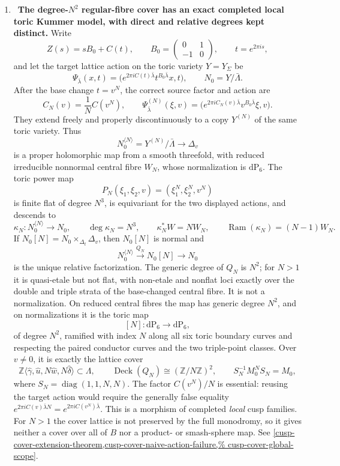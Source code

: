 \begin{enumerate}[leftmargin=1.8em,itemsep=.65em]
\item \Verified\ \textbf{The degree-\(N^2\) regular-fibre cover has an exact
completed local toric Kummer model, with direct and relative degrees kept
distinct.}
Write
\[
 Z(s)=sB_0+C(t),\qquad
 B_0=\begin{pmatrix}0&1\\-1&0\end{pmatrix},\qquad
 t=e^{2\pi i s},
\]
and let the target lattice action on the toric variety \(Y=Y_\Sigma\) be
\[
 \Psi_{\bar\lambda}(x,t)
 =\bigl(e^{2\pi iC(t)\bar\lambda}
        t^{B_0\bar\lambda}x,t\bigr),
 \qquad N_0=Y/\bar\Lambda.
\]
After the base change \(t=v^N\), the correct source factor and action are
\[
 C_N(v)=\frac1N C(v^N),\qquad
 \Psi^{(N)}_{\bar\lambda}(\xi,v)
 =\bigl(e^{2\pi iC_N(v)\bar\lambda}
        v^{B_0\bar\lambda}\xi,v\bigr).
\]
They extend freely and properly discontinuously to a copy \(Y^{(N)}\) of
the same toric variety.  Thus
\[
 N_0^{\langle N\rangle}=Y^{(N)}/\bar\Lambda
 \longrightarrow\Delta_v
\]
is a proper holomorphic map from a smooth threefold, with reduced irreducible
nonnormal central fibre \(W_N\), whose normalization is \(\mathrm{dP}_6\).  The toric
power map
\[
 P_N(\xi_1,\xi_2,v)=(\xi_1^N,\xi_2^N,v^N)
\]
is finite flat of degree \(N^3\), is equivariant for the two displayed
actions, and descends to
\[
 \kappa_N:N_0^{\langle N\rangle}\longrightarrow N_0,
 \qquad \deg\kappa_N=N^3,\qquad
 \kappa_N^*W=NW_N,\qquad
 \operatorname{Ram}(\kappa_N)=(N-1)W_N.
\]
If \(N_0[N]=N_0\times_{\Delta_t}\Delta_v\), then \(N_0[N]\) is normal and
\[
 N_0^{\langle N\rangle}\xrightarrow{Q_N}N_0[N]\longrightarrow N_0
\]
is the unique relative factorization.  The generic degree of \(Q_N\) is
\(N^2\); for \(N>1\) it is quasi-etale but not flat, with non-etale and
nonflat loci exactly over the double and triple strata of the base-changed
central fibre.  It is not a normalization.  On reduced central fibres the
map has generic degree \(N^2\), and on normalizations it is the toric map
\[
 [N]:\mathrm{dP}_6\longrightarrow\mathrm{dP}_6,
\]
of degree \(N^2\), ramified with index \(N\) along all six toric boundary
curves and respecting the paired conductor curves and the two triple-point
classes.  Over \(v\ne0\), it is exactly the lattice cover
\[
 \mathbb Z\langle\widehat\gamma,\widehat u,
 N\widehat w,N\widehat\delta\rangle\subset\Lambda,
 \qquad \operatorname{Deck}(Q_N)\cong(\mathbb Z/N\mathbb Z)^2,
 \qquad S_N^{-1}M_0^NS_N=M_0,
\]
where \(S_N=\operatorname{diag}(1,1,N,N)\).  The factor
\(C(v^N)/N\) is essential: reusing the target action would require the
generally false equality
\(e^{2\pi iC(v)\bar\lambda N}=e^{2\pi iC(v^N)\bar\lambda}\).
This is a morphism of completed \emph{local} cusp families.  For \(N>1\)
the cover lattice is not preserved by the full monodromy, so it gives
neither a cover over all of \(B\) nor a product- or smash-sphere map.  See
\cref{cusp-cover-extension-theorem,cusp-cover-naive-action-failure,%
cusp-cover-global-scope}.


\end{enumerate}
